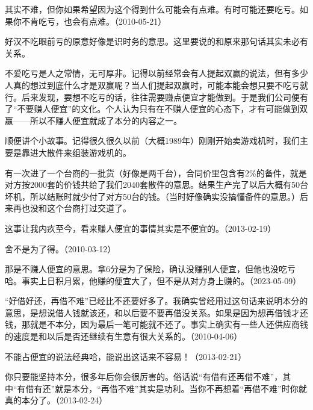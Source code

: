 
其实不难，但你如果希望因为这个得到什么可能会有点难。有时可能还要吃亏。如果你不肯吃亏，也会有点难。（2010-05-21）

好汉不吃眼前亏的原意好像是识时务的意思。这里要说的和原来那句话其实未必有关系。

不爱吃亏是人之常情，无可厚非。记得以前经常会有人提起双赢的说法，但有多少人真的想过到底什么才是双赢呢？当人们提起双赢时，可能本能会想只要不吃亏就行。后来发现，要想不吃亏的话，往往需要赚点便宜才能做到。于是我们公司便有了“不要赚人便宜”的文化。个人认为只有在不赚人便宜的心态下，才有可能做到双赢——所以不赚人便宜就成了本分的内容之一。

顺便讲个小故事。记得很久很久以前（大概1989年）刚刚开始卖游戏机时，我们主要是靠进大散件来组装游戏机的。

有一次进了一个台商的一批货（好像是两千台），合同价里包含有2\%的备件，就是对方按2000套的价钱共给了我们2040套散件的意思。结果生产完了以后大概有50台坏机，所以结账时就少付了对方50台的钱。（当时好像确实没搞懂备件的意思。）后来再也没和这个台商打过交道了。

这事让我内疚至今，看来赚人便宜的事情其实是不便宜的。（2013-02-19）


舍不是为了得。（2010-03-12）


那是不赚人便宜的意思。拿6分是为了保险，确认没赚别人便宜，但他也没吃亏哈。事实上日积月累，他赚的便宜大了，但不是从对方身上赚的。（2023-05-09）


“好借好还，再借不难”已经比不还要好多了。我确实曾经用过这句话来说明本分的意思，是想说借人钱就该还，和以后要不要再借没关系。如果是因为想再借钱才还钱，那就是不本分，因为最后一笔可能就不还了。事实上确实有一些人还供应商钱的速度是和以后是否还继续有生意有很大关系的。（2010-04-06）


不能占便宜的说法经典哈，能说出这话来不容易！（2013-02-21）

你只要能坚持本分，很多年后你会很厉害的。俗话说“有借有还再借不难”，其中“有借有还”就是本分，“再借不难”其实是功利。当你不再想着“再借不难”时你就真的本分了。（2013-02-24）

